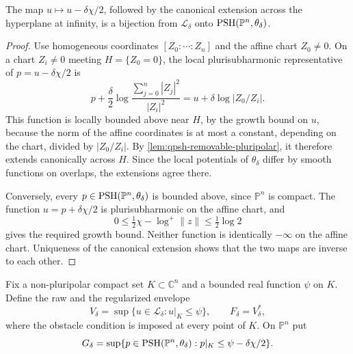 \begin{lemma}\label{lem:affine-projective-growth}
The map $u\mapsto u-\delta\chi/2$, followed by the canonical extension across the hyperplane at infinity, is a bijection from $\mathcal L_\delta$ onto $\mathrm{PSH}(\mathbb P^n,\theta_\delta)$.
\end{lemma}
\begin{proof}
Use homogeneous coordinates $[Z_0:\cdots:Z_n]$ and the affine chart $Z_0\ne0$. On a chart $Z_i\ne0$ meeting $H=\{Z_0=0\}$, the local plurisubharmonic representative of $p=u-\delta\chi/2$ is
\[
 p+\frac\delta2\log\frac{\sum_{j=0}^n|Z_j|^2}{|Z_i|^2}
 =u+\delta\log|Z_0/Z_i|.
\]
This function is locally bounded above near $H$, by the growth bound on $u$, because the norm of the affine coordinates is at most a constant, depending on the chart, divided by $|Z_0/Z_i|$. By \cref{lem:qpsh-removable-pluripolar}, it therefore extends canonically across $H$. Since the local potentials of $\theta_\delta$ differ by smooth functions on overlaps, the extensions agree there.

Conversely, every $p\in\mathrm{PSH}(\mathbb P^n,\theta_\delta)$ is bounded above, since $\mathbb P^n$ is compact. The function $u=p+\delta\chi/2$ is plurisubharmonic on the affine chart, and
\[
 0\leq\tfrac12\chi-\log^+\lVert z\rVert\leq\tfrac12\log2
\]
gives the required growth bound. Neither function is identically $-\infty$ on the affine chart. Uniqueness of the canonical extension shows that the two maps are inverse to each other.
\end{proof}

Fix a non-pluripolar compact set $K\subset\mathbb C^n$ and a bounded real function $\psi$ on $K$. Define the raw and the regularized envelope
\[
 V_\delta=\sup\{u\in\mathcal L_\delta:u|_K\leq\psi\},
 \qquad F_\delta=V_\delta^*,
\]
where the obstacle condition is imposed at every point of $K$. On $\mathbb P^n$ put
\[
 G_\delta=\sup\{p\in\mathrm{PSH}(\mathbb P^n,\theta_\delta):
                 p|_K\leq\psi-\delta\chi/2\}.
\]


